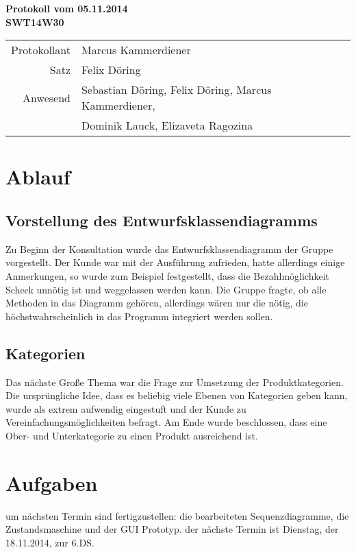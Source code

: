 \documentclass{scrartcl}
\begin{document}
\begin{center}
\LARGE \bf{Protokoll vom 05.11.2014 \\
SWT14W30}
\end{center}

\begin{tabular}{rp{10cm}}
Protokollant & Marcus Kammerdiener \\
Satz & Felix Döring \\
Anwesend & Sebastian Döring, Felix Döring, Marcus Kammerdiener,\\
& Dominik Lauck, Elizaveta Ragozina \\
\end{tabular}

\vspace*{3em}

\section{Ablauf}
\subsection{Vorstellung des Entwurfsklassendiagramms}
Zu Beginn der Konsultation wurde das Entwurfsklassendiagramm der Gruppe vorgestellt. Der Kunde war mit der Ausführung zufrieden, hatte allerdings einige Anmerkungen, so wurde zum Beispiel festgestellt, dass die Bezahlmöglichkeit Scheck unnötig ist und weggelassen werden kann. Die Gruppe fragte, ob alle Methoden in das Diagramm gehören, allerdings wären nur die nötig, die höchstwahrscheinlich in das Programm integriert werden sollen.
\subsection{Kategorien}
Das nächste Große Thema war die Frage zur Umsetzung der Produktkategorien. Die ursprüngliche Idee, dass es beliebig viele Ebenen von Kategorien geben kann, wurde als extrem aufwendig eingestuft und der Kunde zu Vereinfachungsmöglichkeiten befragt. Am Ende wurde beschlossen, dass eine Ober- und Unterkategorie zu einen Produkt ausreichend ist.
\vspace*{1em}

\section{Aufgaben}
um nächsten Termin sind fertigzustellen: die bearbeiteten Sequenzdiagramme, die Zustandsmaschine und der GUI Prototyp.
der nächste Termin ist Dienstag, der 18.11.2014, zur 6.DS.
\end{document}
